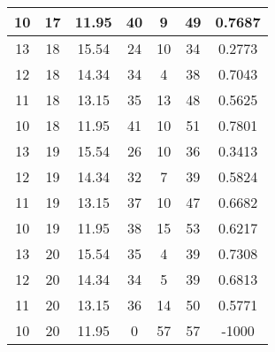 \documentclass[letterpaper, 12pt]{article}
\begin{document}
\begin{longtable}{|c|c|c|c|c|c|c|}
10 & 17 & 11.95 & 40 & 9 & 49 & 0.7687 \\
\hline
13 & 18 & 15.54 & 24 & 10 & 34 & 0.2773 \\
\hline
12 & 18 & 14.34 & 34 & 4 & 38 & 0.7043 \\
\hline
11 & 18 & 13.15 & 35 & 13 & 48 & 0.5625 \\
\hline
10 & 18 & 11.95 & 41 & 10 & 51 & 0.7801 \\
\hline
13 & 19 & 15.54 & 26 & 10 & 36 & 0.3413 \\
\hline
12 & 19 & 14.34 & 32 & 7 & 39 & 0.5824 \\
\hline
11 & 19 & 13.15 & 37 & 10 & 47 & 0.6682 \\
\hline
10 & 19 & 11.95 & 38 & 15 & 53 & 0.6217 \\
\hline
13 & 20 & 15.54 & 35 & 4 & 39 & 0.7308 \\
\hline
12 & 20 & 14.34 & 34 & 5 & 39 & 0.6813 \\
\hline
11 & 20 & 13.15 & 36 & 14 & 50 & 0.5771 \\
\hline
10 & 20 & 11.95 & 0 & 57 & 57 & -1000 \\
\hline
\end{longtable}
\end{document}
